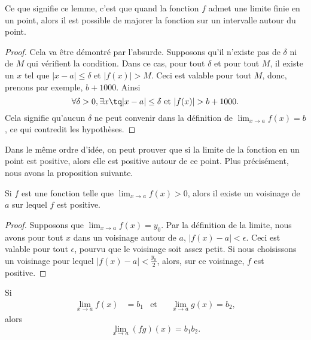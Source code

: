 Ce que signifie ce lemme, c'est que quand la fonction \( f\) admet une limite finie en un point, alors il est possible de majorer la fonction sur un intervalle autour du point.

\begin{proof}
	Cela va être démontré par l'absurde. Supposons qu'il n'existe pas de \( \delta\) ni de \( M\) qui vérifient la condition. Dans ce cas, pour tout \( \delta\) et pour tout \( M\), il existe un \( x\) tel que \( | x-a |\leq\delta\) et \( | f(x) |> M\). Ceci est valable pour tout \( M\), donc, prenons par exemple, \( b+1000\). Ainsi
	\begin{equation}
		\forall\delta>0,\exists x \tq | x-a |\leq\delta\text{ et }| f(x) |>b+1000.
	\end{equation}
	Cela signifie qu'aucun \( \delta\) ne peut convenir dans la définition de \( \lim_{x\to a}f(x)=b\), ce qui contredit les hypothèses.
\end{proof}

Dans le même ordre d'idée, on peut prouver que si la limite de la fonction en un point est positive, alors elle est positive autour de ce point. Plus précisément, nous avons la proposition suivante.

\begin{proposition} \label{PropoLimPosFPos}
	Si \( f\) est une fonction telle que \( \lim_{x\to a}f(x)>0\), alors il existe un voisinage de \( a\) sur lequel \( f\) est positive.
\end{proposition}

\begin{proof}
	Supposons que \( \lim_{x\to a}f(x)=y_0\). Par la définition de la limite, nous avons pour tout \( x\) dans un voisinage autour de \( a\), \( | f(x)-a |<\epsilon\). Ceci est valable pour tout \( \epsilon\), pourvu que le voisinage soit assez petit. Si nous choisissons un voisinage pour lequel \( | f(x)-a |<\frac{ y_0 }{ 2 }\), alors, sur ce voisinage, \( f\) est positive.
\end{proof}

\begin{theorem}     \label{Tholimfgabab}
	Si
	\begin{align}
		\lim_{x\to a}f(x) & =b_1 & \text{et} &  & \lim_{x\to a}g(x)=b_2,
	\end{align}
	alors
	\begin{equation}
		\lim_{x\to a}(fg)(x)=b_1b_2.
	\end{equation}
\end{theorem}

